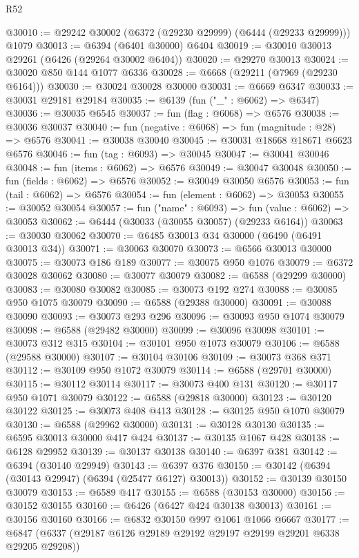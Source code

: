 \begin{lexlean}{R52}
\begin{coremodule}
@30010 := @29242 @30002 (@6372 (@29230 @29999) (@6444 (@29233 @29999))) @1079
@30013 := @6394 (@6401 @30000) @6404
@30019 := @30010 @30013 @29261 (@6426 (@29264 @30002 @6404))
@30020 := @29270 @30013
@30024 := @30020 @850 @144 @1077 @6336
@30028 := @6668 (@29211 (@7969 (@29230 @6164)))
@30030 := @30024 @30028 @30000
@30031 := @6669 @6347
@30033 := @30031 @29181 @29184
@30035 := @6139 (fun ("_" : @6062) => @6347)
@30036 := @30035 @6545
@30037 := fun (flag : @6068) => @6576
@30038 := @30036 @30037
@30040 := fun (negative : @6068) => fun (magnitude : @28) => @6576
@30041 := @30038 @30040
@30045 := @30031 @18668 @18671 @6623 @6576
@30046 := fun (tag : @6093) => @30045
@30047 := @30041 @30046
@30048 := fun (items : @6062) => @6576
@30049 := @30047 @30048
@30050 := fun (fields : @6062) => @6576
@30052 := @30049 @30050 @6576
@30053 := fun (tail : @6062) => @6576
@30054 := fun (element : @6062) => @30053
@30055 := @30052 @30054
@30057 := fun ("name" : @6093) => fun (value : @6062) => @30053
@30062 := @6444 (@30033 (@30055 @30057) (@29233 @6164))
@30063 := @30030 @30062
@30070 := @6485 @30013 @34 @30000 (@6490 (@6491 @30013 @34))
@30071 := @30063 @30070
@30073 := @6566 @30013 @30000
@30075 := @30073 @186 @189
@30077 := @30075 @950 @1076
@30079 := @6372 @30028 @30062
@30080 := @30077 @30079
@30082 := @6588 (@29299 @30000)
@30083 := @30080 @30082
@30085 := @30073 @192 @274
@30088 := @30085 @950 @1075 @30079
@30090 := @6588 (@29388 @30000)
@30091 := @30088 @30090
@30093 := @30073 @293 @296
@30096 := @30093 @950 @1074 @30079
@30098 := @6588 (@29482 @30000)
@30099 := @30096 @30098
@30101 := @30073 @312 @315
@30104 := @30101 @950 @1073 @30079
@30106 := @6588 (@29588 @30000)
@30107 := @30104 @30106
@30109 := @30073 @368 @371
@30112 := @30109 @950 @1072 @30079
@30114 := @6588 (@29701 @30000)
@30115 := @30112 @30114
@30117 := @30073 @400 @131
@30120 := @30117 @950 @1071 @30079
@30122 := @6588 (@29818 @30000)
@30123 := @30120 @30122
@30125 := @30073 @408 @413
@30128 := @30125 @950 @1070 @30079
@30130 := @6588 (@29962 @30000)
@30131 := @30128 @30130
@30135 := @6595 @30013 @30000 @417 @424
@30137 := @30135 @1067 @428
@30138 := @6128 @29952
@30139 := @30137 @30138
@30140 := @6397 @381
@30142 := @6394 (@30140 @29949)
@30143 := @6397 @376
@30150 := @30142 (@6394 (@30143 @29947) (@6394 (@25477 @6127) @30013))
@30152 := @30139 @30150 @30079
@30153 := @6589 @417
@30155 := @6588 (@30153 @30000)
@30156 := @30152 @30155
@30160 := @6426 (@6427 @424 @30138 @30013)
@30161 := @30156 @30160
@30166 := @6832 @30150 @997 @1061 @1066 @6667
@30177 := @6847 (@6337 (@29187 @6126 @29189 @29192 @29197 @29199 @29201 @6338 @29205 @29208))

\end{coremodule}
\end{lexlean}
